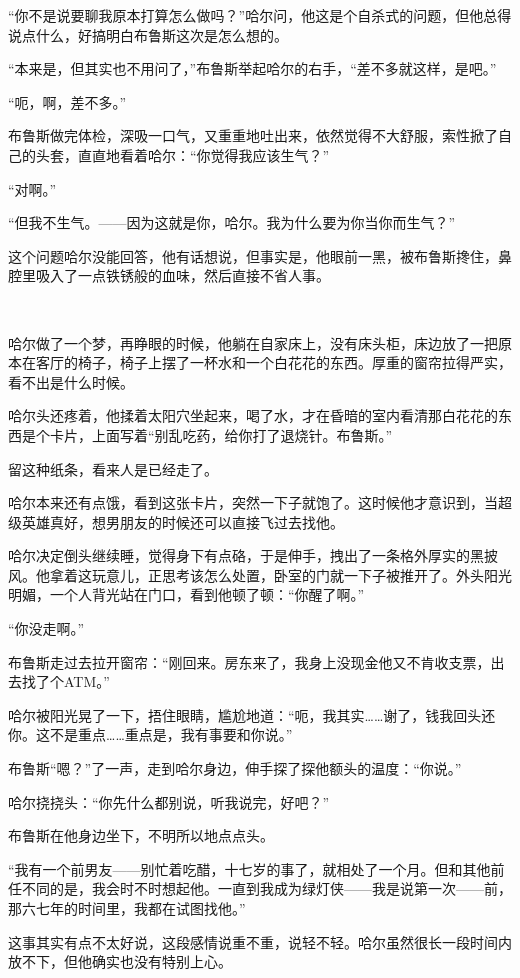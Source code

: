 \documentclass[../main]{subfiles}
\begin{document}
“你不是说要聊我原本打算怎么做吗？”哈尔问，他这是个自杀式的问题，但他总得说点什么，好搞明白布鲁斯这次是怎么想的。

“本来是，但其实也不用问了，”布鲁斯举起哈尔的右手，“差不多就这样，是吧。”

“呃，啊，差不多。”

布鲁斯做完体检，深吸一口气，又重重地吐出来，依然觉得不大舒服，索性掀了自己的头套，直直地看着哈尔：“你觉得我应该生气？”

“对啊。”

“但我不生气。——因为这就是你，哈尔。我为什么要为你当你而生气？”

这个问题哈尔没能回答，他有话想说，但事实是，他眼前一黑，被布鲁斯搀住，鼻腔里吸入了一点铁锈般的血味，然后直接不省人事。

~\

哈尔做了一个梦，再睁眼的时候，他躺在自家床上，没有床头柜，床边放了一把原本在客厅的椅子，椅子上摆了一杯水和一个白花花的东西。厚重的窗帘拉得严实，看不出是什么时候。

哈尔头还疼着，他揉着太阳穴坐起来，喝了水，才在昏暗的室内看清那白花花的东西是个卡片，上面写着“别乱吃药，给你打了退烧针。布鲁斯。”

留这种纸条，看来人是已经走了。

哈尔本来还有点饿，看到这张卡片，突然一下子就饱了。这时候他才意识到，当超级英雄真好，想男朋友的时候还可以直接飞过去找他。

哈尔决定倒头继续睡，觉得身下有点硌，于是伸手，拽出了一条格外厚实的黑披风。他拿着这玩意儿，正思考该怎么处置，卧室的门就一下子被推开了。外头阳光明媚，一个人背光站在门口，看到他顿了顿：“你醒了啊。”

“你没走啊。”

布鲁斯走过去拉开窗帘：“刚回来。房东来了，我身上没现金他又不肯收支票，出去找了个ATM。”

哈尔被阳光晃了一下，捂住眼睛，尴尬地道：“呃，我其实……谢了，钱我回头还你。这不是重点……重点是，我有事要和你说。”

布鲁斯“嗯？”了一声，走到哈尔身边，伸手探了探他额头的温度：“你说。”

哈尔挠挠头：“你先什么都别说，听我说完，好吧？”

布鲁斯在他身边坐下，不明所以地点点头。

“我有一个前男友——别忙着吃醋，十七岁的事了，就相处了一个月。但和其他前任不同的是，我会时不时想起他。一直到我成为绿灯侠——我是说第一次——前，那六七年的时间里，我都在试图找他。”

这事其实有点不太好说，这段感情说重不重，说轻不轻。哈尔虽然很长一段时间内放不下，但他确实也没有特别上心。
\end{document}
